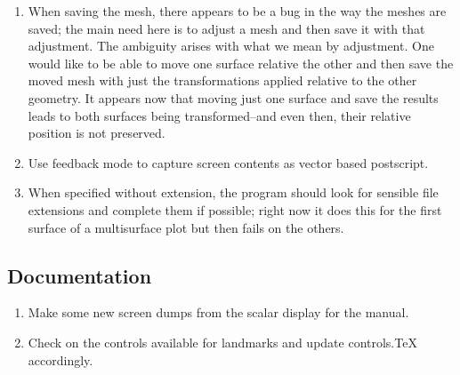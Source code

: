 \documentclass[11pt]{article}
\newcommand{\map}{\emph{map3d}}
\begin{document}
  \begin{enumerate}
    \item When saving the mesh, there appears to be a bug in the way the
          meshes are saved; the main need here is to adjust a mesh and then
          save it with that adjustment.  The ambiguity arises with what we
          mean by adjustment.  One would like to be able to move one surface
          relative the other and then save the moved mesh with just the
          transformations applied relative to the other geometry.  It
          appears now that moving just one surface and save the results
          leads to both surfaces being transformed--and even then, their
          relative position is not preserved.
    \item Use feedback mode to capture screen contents as vector based
          postscript.
    \item When specified without extension, the program should look for
          sensible file extensions and complete them if possible; right now
          it does this for the first surface of a multisurface plot but
          then fails on the others.
  \end{enumerate}

\subsection{Documentation}

  \begin{enumerate}
    \item Make some new screen dumps from the scalar display for the
          manual. 
    \item Check on the controls available for landmarks and update
          controls.\TeX{} accordingly.
  \end{enumerate}
\end{document}
